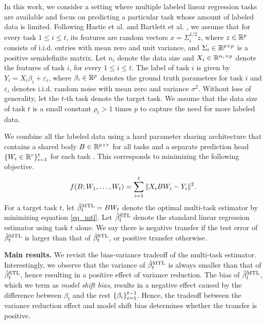 In this work, we consider a setting where multiple labeled linear regression tasks are available and focus on predicting a particular task whose amount of labeled data is limited.
Following Hastie et al. \cite{HMRT19} and Bartlett et al. \cite{BLLT20}, we assume that for every task $1\le i\le t$, its features are random vectors $x = \Sigma_i^{1/2}z$, where $z\in\mathbb{R}^p$ consists of i.i.d. entries with mean zero and unit variance, and $\Sigma_i\in\mathbb{R}^{p\times p}$ is a positive semidefinite matrix.
Let $n_i$ denote the data size and $X_i\in\mathbb{R}^{n_i\times p}$ denote the features of task $i$, for every $1\le i\le t$.
The label of task $i$ is given by $Y_i = X_i\beta_i + \varepsilon_i$, where $\beta_i\in\mathbb{R}^p$ denotes the ground truth parameters for task $i$ and $\varepsilon_i$ denotes i.i.d. random noise with mean zero and variance $\sigma^2$.
Without loss of generality, let the $t$-th task denote the target task.
We assume that the data size of task $t$ is a small constant $\rho_t > 1$ times $p$ to capture the need for more labeled data.

We combine all the labeled data using a hard parameter sharing architecture that contains a shared body $B\in\mathbb{R}^{p\times r}$ for all tasks and a separate prediction head $\{W_i \in \mathbb{R}^{r}\}_{i=1}^t$ for each task \cite{R17,MTDNN19,WZR20}.
This corresponds to minimizing the following objective.
\begin{align}
	\label{eq_mtl}
	f(B; W_1, \dots, W_t) = \sum_{i=1}^t \|X_i B W_i - Y_i\|^2.
\end{align}
For a target task $t$,
let $\hat{\beta}_t^{\text{MTL}} = B W_t$ denote the optimal multi-task estimator by minimizing equation \eqref{eq_mtl}.
Let $\hat{\beta}_t^{\text{STL}}$ denote the standard linear regression estimator using task $t$ alone.
We say there is negative transfer if the test error of $\hat{\beta}_t^{\text{MTL}}$  is larger than that of $\hat{\beta}_t^{\text{STL}}$, or positive transfer otherwise.

\textbf{Main results.}
We revisit the bias-variance tradeoff of the multi-task estimator.
Interestingly, we observe that the variance of $\hat{\beta}_t^{\text{MTL}}$ is always smaller than that of $\hat{\beta}_t^{\text{STL}}$, hence resulting in a positive effect of variance reduction.
The bias of $\hat{\beta}_t^{\text{MTL}}$, which we term as \textit{model shift bias}, results in a negative effect caused by the difference between $\beta_t$ and the rest $\{\beta_i\}_{i=1}^{t-1}$.
Hence, the tradeoff between the variance reduction effect and model shift bias determines whether the transfer is positive.

